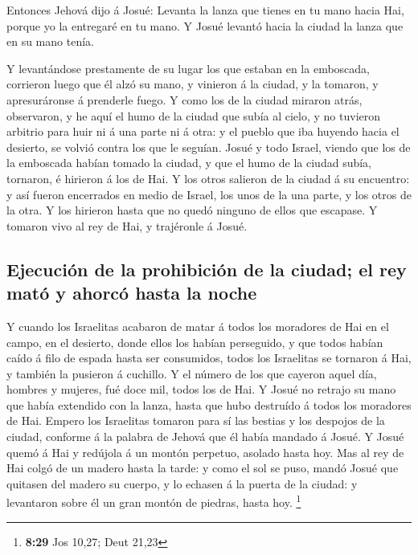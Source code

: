  Entonces Jehová dijo á Josué: Levanta la lanza que tienes
en tu mano hacia Hai, porque yo la entregaré en tu mano. Y Josué levantó
hacia la ciudad la lanza que en su mano tenía.

 Y levantándose prestamente de su lugar los que estaban en
la emboscada, corrieron luego que él alzó su mano, y vinieron á la
ciudad, y la tomaron, y apresuráronse á prenderle fuego.  Y
como los de la ciudad miraron atrás, observaron, y he aquí el humo de la
ciudad que subía al cielo, y no tuvieron arbitrio para huir ni á una
parte ni á otra: y el pueblo que iba huyendo hacia el desierto, se
volvió contra los que le seguían.  Josué y todo Israel,
viendo que los de la emboscada habían tomado la ciudad, y que el humo de
la ciudad subía, tornaron, é hirieron á los de Hai.  Y los
otros salieron de la ciudad á su encuentro: y así fueron encerrados en
medio de Israel, los unos de la una parte, y los otros de la otra. Y los
hirieron hasta que no quedó ninguno de ellos que escapase. 
Y tomaron vivo al rey de Hai, y trajéronle á Josué.

\hypertarget{ejecuciuxf3n-de-la-prohibiciuxf3n-de-la-ciudad-el-rey-matuxf3-y-ahorcuxf3-hasta-la-noche}{%
\subsection{Ejecución de la prohibición de la ciudad; el rey mató y
ahorcó hasta la
noche}\label{ejecuciuxf3n-de-la-prohibiciuxf3n-de-la-ciudad-el-rey-matuxf3-y-ahorcuxf3-hasta-la-noche}}

 Y cuando los Israelitas acabaron de matar á todos los
moradores de Hai en el campo, en el desierto, donde ellos los habían
perseguido, y que todos habían caído á filo de espada hasta ser
consumidos, todos los Israelitas se tornaron á Hai, y también la
pusieron á cuchillo.  Y el número de los que cayeron aquel
día, hombres y mujeres, fué doce mil, todos los de Hai.  Y
Josué no retrajo su mano que había extendido con la lanza, hasta que
hubo destruído á todos los moradores de Hai.  Empero los
Israelitas tomaron para sí las bestias y los despojos de la ciudad,
conforme á la palabra de Jehová que él había mandado á Josué.
 Y Josué quemó á Hai y redújola á un montón perpetuo,
asolado hasta hoy.  Mas al rey de Hai colgó de un madero
hasta la tarde: y como el sol se puso, mandó Josué que quitasen del
madero su cuerpo, y lo echasen á la puerta de la ciudad: y levantaron
sobre él un gran montón de piedras, hasta hoy. \footnote{\textbf{8:29}
  Jos 10,27; Deut 21,23}

